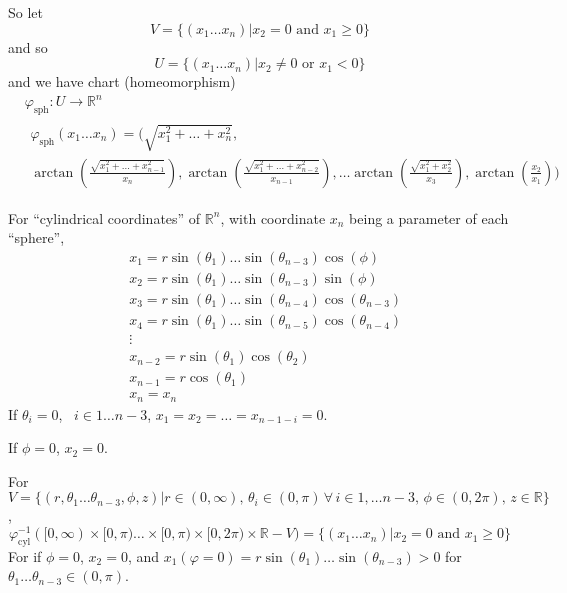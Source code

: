 \documentclass[10pt, twoside]{amsart}
\begin{document}
\begin{multicols*}{2}
So let 
\[
V = \lbrace (x_1 \dots x_n) | x_2 = 0 \text{ and } x_1 \geq 0 \rbrace
\]
and so
\begin{equation}\label{Eq:UsphericalRn}
U = \lbrace (x_1 \dots x_n) | x_2 \neq 0 \text{ or } x_1 < 0 \rbrace
\end{equation}
and we have chart (homeomorphism)
\[
\begin{aligned}
  & \varphi_{\text{sph}}: U \to \mathbb{R}^n \\ 
  & \begin{gathered} \varphi_{\text{sph}}(x_1 \dots x_n) = ( \sqrt{ x_1^2+\dots +x_n^2},  \\
  \arctan{\left( \frac{\sqrt{ x_1^2 + \dots +x^2_{n-1}}}{ x_n} \right) },\arctan{ \left( \frac{\sqrt{x_1^2 + \dots + x_{n-2}^2}}{x_{n-1}} \right)}, \dots \arctan{\left( \frac{\sqrt{x_1^2 + x_2^2}}{x_3} \right)}, \arctan{\left( \frac{x_2}{x_1} \right) } ) \end{gathered}
\end{aligned}
\]

For ``cylindrical coordinates'' of $\mathbb{R}^n$, with coordinate $x_n$ being a parameter of each ``sphere'', 
\begin{equation}\label{Eq:Rncylindricalcoordinates}
\begin{aligned}
  & x_1 = r\sin{(\theta_1)} \dots \sin{(\theta_{n-3})} \cos{(\phi)} \\ 
  & x_2 = r\sin{(\theta_1)} \dots \sin{(\theta_{n-3})} \sin{(\phi)} \\ 
  & x_3 = r\sin{(\theta_1)} \dots \sin{(\theta_{n-4})} \cos{(\theta_{n-3})} \\ 
  & x_4 = r\sin{(\theta_1)} \dots \sin{(\theta_{n-5})} \cos{(\theta_{n-4})} \\
  & \vdots \\ 
  & x_{n-2} = r\sin{(\theta_1)}\cos{(\theta_2)} \\ 
  & x_{n-1} = r\cos{(\theta_1)} \\ 
  & x_n = x_n
\end{aligned}
\end{equation}
If $\theta_i =0$, \, $i \in 1\dots n-3$, $x_1 = x_2 = \dots = x_{n-1-i} = 0$.  

If $\phi =0$, $x_2=0$.  

For $V = \lbrace (r,\theta_1 \dots \theta_{n-3}, \phi, z) | r \in (0,\infty), \, \theta_i \in (0,\pi) \, \forall \, i \in 1, \dots n-3, \, \phi \in (0,2\pi), \, z \in \mathbb{R} \rbrace$,
\[
\varphi_{\text{cyl}}^{-1}([0,\infty) \times [0,\pi) \dots \times [0,\pi) \times [0,2\pi) \times \mathbb{R}  -V) = \lbrace (x_1 \dots x_n) | x_2 = 0 \text{ and } x_1 \geq 0 \rbrace
\]
For if $\phi = 0$, $x_2=0$, and $x_1(\varphi =0) = r\sin{(\theta_1)} \dots \sin{(\theta_{n-3})} >0 $ for $\theta_1 \dots \theta_{n-3} \in (0,\pi)$.  


\end{multicols*}
\end{document}

